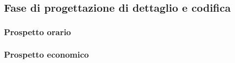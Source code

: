 \subsection{Fase di progettazione di dettaglio e codifica}
\subsubsection{Prospetto orario}
\subsubsection{Prospetto economico}


